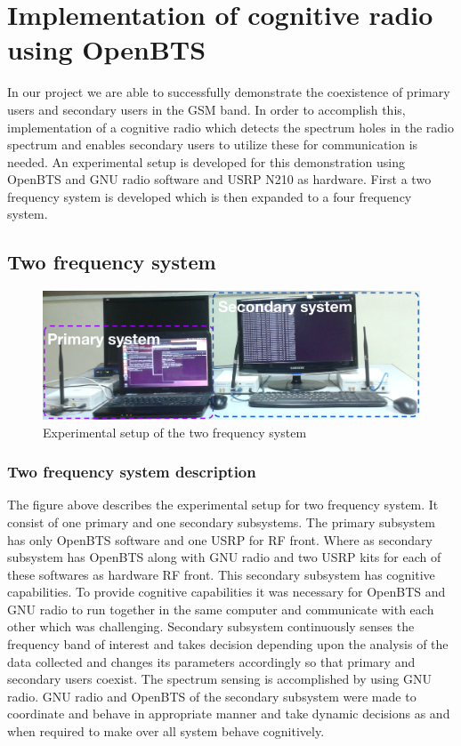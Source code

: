 \chapter{Implementation of cognitive radio using OpenBTS}

In our project we are able to successfully demonstrate the coexistence of 
primary users and secondary users in the GSM band. In order to accomplish this, 
implementation of a cognitive radio which detects the spectrum holes in the 
radio spectrum and enables secondary users to utilize these for communication 
is needed. An experimental setup is developed for this demonstration using 
OpenBTS and GNU radio software and USRP N210 as hardware. First a two frequency 
system is developed which is then expanded to a four frequency system.


\section{Two frequency system}

\begin{figure}
\centering
\includegraphics[width=1\textwidth]{../images/freq2}
\caption[Experimental setup, 2-frequency system]{Experimental setup of the two
 frequency system}
\label{freq2}
\end{figure}


\subsection{Two frequency system description}
The figure above describes the experimental setup for two frequency system. It 
consist of one primary and one secondary subsystems. The primary subsystem has 
only OpenBTS software and one USRP for RF front. Where as secondary subsystem 
has OpenBTS along with GNU radio and two USRP kits for each of these softwares 
as hardware RF front. This secondary subsystem has cognitive capabilities. To 
provide cognitive capabilities it was necessary for OpenBTS and GNU radio to run 
together in the same computer and communicate with each other which was challenging. 
Secondary subsystem continuously senses the frequency band of interest and  
takes decision depending upon the analysis of the data collected and changes 
its parameters accordingly so that primary and secondary users coexist. The 
spectrum sensing is accomplished by using GNU radio.  GNU radio and 
OpenBTS of the secondary subsystem were made to coordinate and behave in appropriate manner and take dynamic decisions 
as and when required to make over all system behave cognitively.

